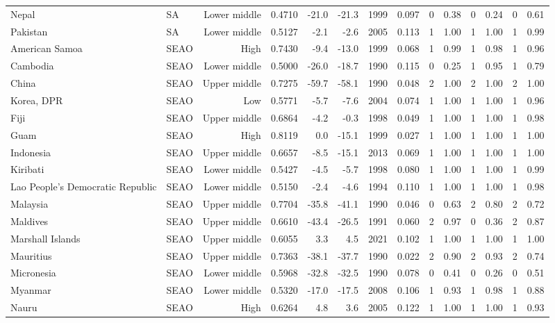 \begin{longtable}{llrrrrrrrrrrrr}
Nepal & SA & Lower middle & 0.4710 & -21.0 & -21.3 & 1999 & 0.097 & 0 & 0.38 & 0 & 0.24 & 0 & 0.61 \\
Pakistan & SA & Lower middle & 0.5127 &  -2.1 &  -2.6 & 2005 & 0.113 & 1 & 1.00 & 1 & 1.00 & 1 & 0.99 \\
American Samoa & SEAO & High & 0.7430 &  -9.4 & -13.0 & 1999 & 0.068 & 1 & 0.99 & 1 & 0.98 & 1 & 0.96 \\
Cambodia & SEAO & Lower middle & 0.5000 & -26.0 & -18.7 & 1990 & 0.115 & 0 & 0.25 & 1 & 0.95 & 1 & 0.79 \\
China & SEAO & Upper middle & 0.7275 & -59.7 & -58.1 & 1990 & 0.048 & 2 & 1.00 & 2 & 1.00 & 2 & 1.00 \\
Korea, DPR & SEAO & Low & 0.5771 &  -5.7 &  -7.6 & 2004 & 0.074 & 1 & 1.00 & 1 & 1.00 & 1 & 0.96 \\
Fiji & SEAO & Upper middle & 0.6864 &  -4.2 &  -0.3 & 1998 & 0.049 & 1 & 1.00 & 1 & 1.00 & 1 & 0.98 \\
Guam & SEAO & High & 0.8119 &   0.0 & -15.1 & 1999 & 0.027 & 1 & 1.00 & 1 & 1.00 & 1 & 1.00 \\
Indonesia & SEAO & Upper middle & 0.6657 &  -8.5 & -15.1 & 2013 & 0.069 & 1 & 1.00 & 1 & 1.00 & 1 & 1.00 \\
Kiribati & SEAO & Lower middle & 0.5427 &  -4.5 &  -5.7 & 1998 & 0.080 & 1 & 1.00 & 1 & 1.00 & 1 & 0.99 \\
Lao People's Democratic Republic & SEAO & Lower middle & 0.5150 &  -2.4 &  -4.6 & 1994 & 0.110 & 1 & 1.00 & 1 & 1.00 & 1 & 0.98 \\
Malaysia & SEAO & Upper middle & 0.7704 & -35.8 & -41.1 & 1990 & 0.046 & 0 & 0.63 & 2 & 0.80 & 2 & 0.72 \\
Maldives & SEAO & Upper middle & 0.6610 & -43.4 & -26.5 & 1991 & 0.060 & 2 & 0.97 & 0 & 0.36 & 2 & 0.87 \\
Marshall Islands & SEAO & Upper middle & 0.6055 &   3.3 &   4.5 & 2021 & 0.102 & 1 & 1.00 & 1 & 1.00 & 1 & 1.00 \\
Mauritius & SEAO & Upper middle & 0.7363 & -38.1 & -37.7 & 1990 & 0.022 & 2 & 0.90 & 2 & 0.93 & 2 & 0.74 \\
Micronesia & SEAO & Lower middle & 0.5968 & -32.8 & -32.5 & 1990 & 0.078 & 0 & 0.41 & 0 & 0.26 & 0 & 0.51 \\
Myanmar & SEAO & Lower middle & 0.5320 & -17.0 & -17.5 & 2008 & 0.106 & 1 & 0.93 & 1 & 0.98 & 1 & 0.88 \\
Nauru & SEAO & High & 0.6264 &   4.8 &   3.6 & 2005 & 0.122 & 1 & 1.00 & 1 & 1.00 & 1 & 0.93 \\

\end{longtable}
